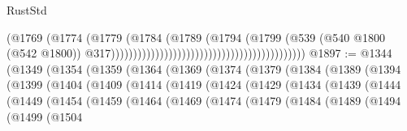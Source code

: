 \begin{lexlean}{RustStd}
\begin{coremodule}
                                                                            (@1769
                                                                              (@1774
                                                                                (@1779
                                                                                  (@1784
                                                                                    (@1789
                                                                                      (@1794
                                                                                        (@1799
                                                                                          (@539
                                                                                            (@540
                                                                                              @1800
                                                                                              (@542
                                                                                                @1800))
                                                                                            @317))))))))))))))))))))))))))))))))))))))))))))
@1897 := @1344
    (@1349
      (@1354
        (@1359
          (@1364
            (@1369
              (@1374
                (@1379
                  (@1384
                    (@1389
                      (@1394
                        (@1399
                          (@1404
                            (@1409
                              (@1414
                                (@1419
                                  (@1424
                                    (@1429
                                      (@1434
                                        (@1439
                                          (@1444
                                            (@1449
                                              (@1454
                                                (@1459
                                                  (@1464
                                                    (@1469
                                                      (@1474
                                                        (@1479
                                                          (@1484
                                                            (@1489
                                                              (@1494
                                                                (@1499
                                                                  (@1504

\end{coremodule}
\end{lexlean}
